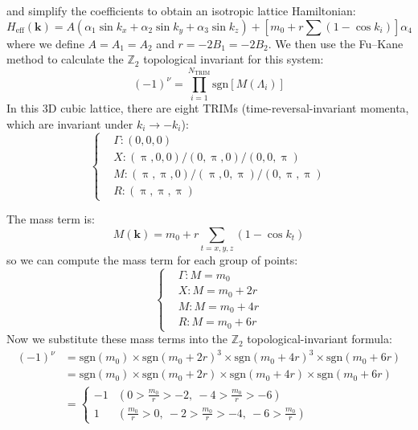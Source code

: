 and simplify the coefficients to obtain an isotropic lattice Hamiltonian:
\begin{equation}
H_{\mathrm{eff}}(\bm{k}) = A(\alpha_1 \sin k_x + \alpha_2 \sin k_y + \alpha_3 \sin k_z) + [m_0 + r \sum (1 - \cos k_i)] \alpha_4
\end{equation}
where we define $A=A_1=A_2$ and $r=-2B_1=-2B_2$.
We then use the Fu--Kane method to calculate the $\mathbb{Z}_2$ topological invariant for this system:
\begin{equation}
(-1)^\nu = \prod_{i=1}^{N_{\mathrm{TRIM}}} \mathrm{sgn}[M(\Lambda_i)]
\end{equation}
In this 3D cubic lattice, there are eight TRIMs (time-reversal-invariant momenta, which are invariant under $k_i \to -k_i$):
\begin{equation}
\left\{
\begin{aligned}
&\Gamma : (0,0,0) \\
&X : (\uppi,0,0)/ (0,\uppi,0)/ (0,0,\uppi) \\
&M : (\uppi,\uppi,0)/ (\uppi,0,\uppi)/ (0,\uppi,\uppi) \\
&R : (\uppi,\uppi,\uppi)
\end{aligned}
\right.
\end{equation}



The mass term is:
\begin{equation}
M(\bm{k}) = m_0 + r \sum_{t=x,y,z} (1 - \cos k_t)
\end{equation}
so we can compute the mass term for each group of points:
\begin{equation}
\left\{
\begin{aligned}
&\Gamma : M = m_0 \\
&X : M = m_0 + 2r \\
&M : M = m_0 + 4r \\
&R : M = m_0 + 6r
\end{aligned}
\right.
\end{equation}
Now we substitute these mass terms into the $\mathbb{Z}_2$ topological-invariant formula:
\begin{equation}
\begin{aligned}
(-1)^\nu &= \mathrm{sgn}(m_0) \times \mathrm{sgn}(m_0 + 2r)^3 \times \mathrm{sgn}(m_0 + 4r)^3 \times \mathrm{sgn}(m_0 + 6r) \\
&= \mathrm{sgn}(m_0) \times \mathrm{sgn}(m_0 + 2r) \times \mathrm{sgn}(m_0 + 4r) \times \mathrm{sgn}(m_0 + 6r) \\
&= \begin{cases}
-1 & (0 > \frac{m_0}{r} > -2, \ -4 > \frac{m_0}{r} > -6) \\
1 & (\frac{m_0}{r} > 0, \ -2 > \frac{m_0}{r} > -4, \ -6 > \frac{m_0}{r})
\end{cases}
\end{aligned}
\end{equation}

